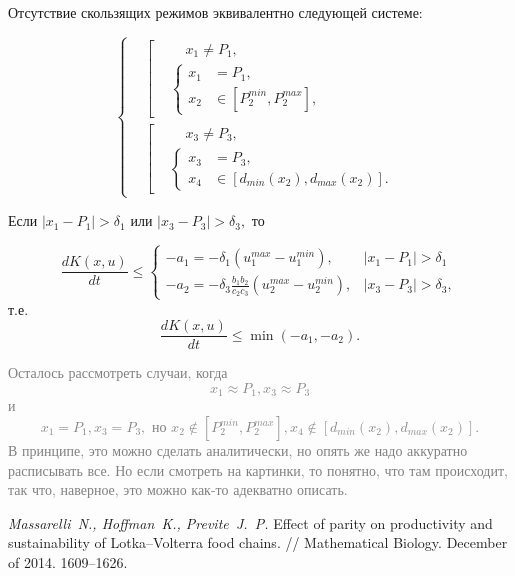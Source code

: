 \documentclass[11pt]{article}
\begin{document}
Отсутствие скользящих режимов эквивалентно следующей системе:

$$
	\left\{
	\begin{aligned}
		&\left[
		\begin{aligned}
			& \;\;\;\; x_1 \ne P_1, \\
			&\left\{
			\begin{aligned}
				x_1 &= P_1, \\
				x_2 & \in [P_2^{min}, P_2^{max}], 
			\end{aligned}
			\right.
		\end{aligned}
		\right. \\
		&\left[
		\begin{aligned}
			& \;\;\;\; x_3 \ne P_3, \\
			&\left\{
			\begin{aligned}
				x_3 &= P_3, \\
				x_4 & \in [d_{min}(x_2), d_{max}(x_2)].
			\end{aligned}
			\right.
		\end{aligned}
		\right.
	\end{aligned}
	\right.
$$

Если $|x_1 - P_1| > \delta_1$ или $|x_3 - P_3| > \delta_3,$ то 

$$
	\frac{dK(x,u)}{dt} \leqslant \begin{cases} -a_1 = -\delta_1(u_1^{max} - u_1^{min}), &  |x_1 - P_1| > \delta_1 \\ -a_2 = -\delta_3\frac{b_1b_2}{c_2c_3}(u_2^{max} - u_2^{min}), & |x_3 - P_3| > \delta_3, \end{cases}
$$
т.е.
$$\frac{dK(x,u)}{dt} \leqslant \min(-a_1, -a_2).$$

\textcolor{gray}{Осталось рассмотреть случаи, когда $$x_1 \approx P_1, x_3 \approx P_3$$ и $$x_1 = P_1, x_3 = P_3, \text{ но } x_2 \notin [P_2^{min}, P_2^{max}], x_4 \notin [d_{min}(x_2), d_{max}(x_2)].$$
В принципе, это можно сделать аналитически, но опять же надо аккуратно расписывать все. Но если смотреть на картинки, то понятно, что там происходит, так что, наверное, это можно как-то адекватно описать.}

\clearpage
\newpage
\begin{thebibliography}{0}
 {\it Massarelli~N., Hoffman~K., Previte~J.~P.} Effect of parity on productivity and sustainability of Lotka–Volterra food chains. // Mathematical Biology. December of 2014. 1609--1626.
\end{thebibliography}
\end{document}
